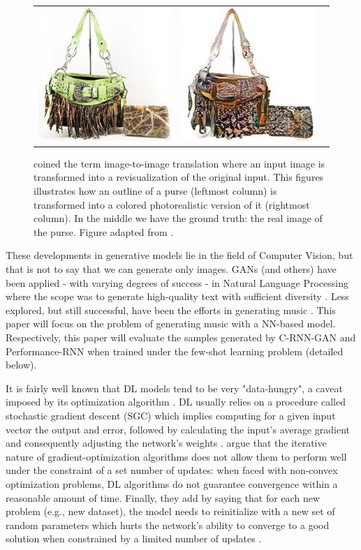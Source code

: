 \begin{figure}[t]
\begin{tabular}{ccc}
    \includegraphics[width=.15\linewidth]{images/handbags_edges_lotsofresults_latex/gt_130_AB.jpg} &
    \includegraphics[width=.15\linewidth]{images/handbags_edges_lotsofresults_latex/L1cGAN_130_AB.jpg} \\
    \end{tabular}
    \caption{\textcite{isola_image--image_2016} coined the term image-to-image translation where an input image is transformed into a revisualization of the original input. This figures illustrates how an outline of a purse (leftmost column) is transformed into a colored photorealistic version of it (rightmost column). In the middle we have the ground truth: the real image of the purse. Figure adapted from \textcite{isola_image--image_2016}.}
    \label{fig:pix2pix}
\end{figure}

These developments in generative models lie in the field of Computer Vision, but that is not to say that we can generate only images. GANs (and others) have been applied - with varying degrees of success - in Natural Language Processing where the scope was to generate high-quality text with sufficient diversity \parencite[e.g.,][]{yu_seqgan_2016, chen_adversarial_2018}. Less explored, but still successful, have been the efforts in generating music \parencite[e.g.,][]{mogren_c-rnn-gan_2016, dong_musegan_2017}. This paper will focus on the problem of generating music with a NN-based model. Respectively, this paper will evaluate the samples generated by C-RNN-GAN \parencite{mogren_c-rnn-gan_2016} and Performance-RNN \parencite{oore_this_2018} when trained under the few-shot learning problem (detailed below).

It is fairly well known that DL models tend to be very "data-hungry", a caveat imposed by its optimization algorithm \parencite{chen_closer_2018, ravi_optimization_2016}. DL usually relies on a procedure called stochastic gradient descent (SGC) which implies computing for a given input vector the output and error, followed by calculating the input's average gradient and consequently adjusting the network's weights \parencite{lecun_deep_2015}. \textcite{ravi_optimization_2016} argue that the iterative nature of gradient-optimization algorithms does not allow them to perform well under the constraint of a set number of updates: when faced with non-convex optimization problems, DL algorithms do not guarantee convergence within a reasonable amount of time. Finally, they add by saying that for each new problem (e.g., new dataset), the model needs to reinitialize with a new set of random parameters which hurts the network's ability to converge to a good solution when constrained by a limited number of updates \parencite{ravi_optimization_2016}.

